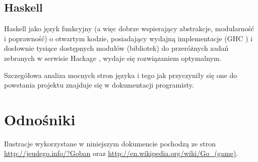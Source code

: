 \documentclass[11pt,leqno]{article}
\begin{document}
\subsection{Haskell}
Haskell \cite{haskell} jako język funkcyjny (a więc dobrze wspierający abstrakcje,
 modularność i poprawność) o otwartym kodzie, posiadający wydajną implementacje (GHC \cite{ghc}) i dosłownie tysiące dostępnych modułów
 (bibliotek) do przeróżnych zadań zebranych w serwisie Hackage \cite{hackage}, wydaje się rozwiązaniem optymalnym.

Szczegółowa analiza mocnych stron języka i tego jak przyczyniły się one do powstania projektu znajduje się w dokumentacji programisty.

\section{Odnośniki}
Ilustracje wykorzystane w niniejszym dokumencie pochodzą ze stron \url{http://jeudego.info/?Goban} oraz 
\url{http://en.wikipedia.org/wiki/Go\_(game)}.
\end{document}
